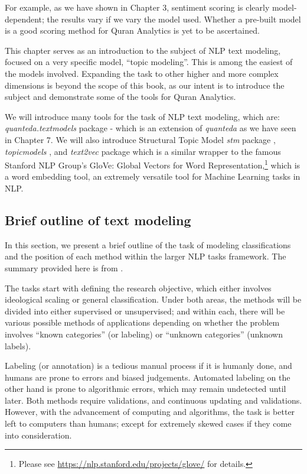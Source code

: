 \documentclass[
]{article}
\begin{document}
For example, as we have shown in Chapter 3, sentiment scoring is clearly model-dependent; the results vary if we vary the model used. Whether a pre-built model is a good scoring method for Quran Analytics is yet to be ascertained.

This chapter serves as an introduction to the subject of NLP text modeling, focused on a very specific model, ``topic modeling''. This is among the easiest of the models involved. Expanding the task to other higher and more complex dimensions is beyond the scope of this book, as our intent is to introduce the subject and demonstrate some of the tools for Quran Analytics.

We will introduce many tools for the task of NLP text modeling, which are: \emph{quanteda.textmodels} \citep{quantedatextmodels} package - which is an extension of \emph{quanteda} as we have seen in Chapter 7. We will also introduce Structural Topic Model \emph{stm} package \citep{stm}, \emph{topicmodels} \citep{topicmodels}, and \emph{text2vec} \citep{text2vec} package which is a similar wrapper to the famous Stanford NLP Group's GloVe: Global Vectors for Word Representation,\footnote{Please see \url{https://nlp.stanford.edu/projects/glove/} for details.} which is a word embedding tool, an extremely versatile tool for Machine Learning tasks in NLP.

\hypertarget{brief-outline-of-text-modeling}{%
\subsection{Brief outline of text modeling}\label{brief-outline-of-text-modeling}}

In this section, we present a brief outline of the task of modeling classifications and the position of each method within the larger NLP tasks framework. The summary provided here is from \citep{grimmer2013}.

The tasks start with defining the research objective, which either involves ideological scaling or general classification. Under both areas, the methods will be divided into either supervised or unsupervised; and within each, there will be various possible methods of applications depending on whether the problem involves ``known categories'' (or labeling) or ``unknown categories'' (unknown labels).

Labeling (or annotation) is a tedious manual process if it is humanly done, and humans are prone to errors and biased judgements. Automated labeling on the other hand is prone to algorithmic errors, which may remain undetected until later. Both methods require validations, and continuous updating and validations. However, with the advancement of computing and algorithms, the task is better left to computers than humans; except for extremely skewed cases if they come into consideration.
\end{document}
